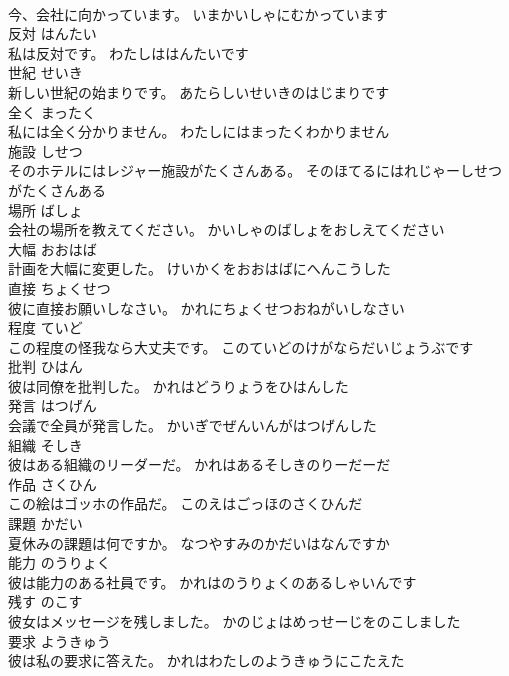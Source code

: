 \documentclass[8pt]{extreport}
\begin{document}
\begin{CJK}{UTF8}{min}
\\	今、会社に向かっています。	いまかいしゃにむかっています	
\\	反対	はんたい	
\\	私は反対です。	わたしははんたいです	
\\	世紀	せいき	
\\	新しい世紀の始まりです。	あたらしいせいきのはじまりです	
\\	全く	まったく	
\\	私には全く分かりません。	わたしにはまったくわかりません	
\\	施設	しせつ	
\\	そのホテルにはレジャー施設がたくさんある。	そのほてるにはれじゃーしせつがたくさんある	
\\	場所	ばしょ	
\\	会社の場所を教えてください。	かいしゃのばしょをおしえてください	
\\	大幅	おおはば	
\\	計画を大幅に変更した。	けいかくをおおはばにへんこうした	
\\	直接	ちょくせつ	
\\	彼に直接お願いしなさい。	かれにちょくせつおねがいしなさい	
\\	程度	ていど	
\\	この程度の怪我なら大丈夫です。	このていどのけがならだいじょうぶです	
\\	批判	ひはん	
\\	彼は同僚を批判した。	かれはどうりょうをひはんした	
\\	発言	はつげん	
\\	会議で全員が発言した。	かいぎでぜんいんがはつげんした	
\\	組織	そしき	
\\	彼はある組織のリーダーだ。	かれはあるそしきのりーだーだ	
\\	作品	さくひん	
\\	この絵はゴッホの作品だ。	このえはごっほのさくひんだ	
\\	課題	かだい	
\\	夏休みの課題は何ですか。	なつやすみのかだいはなんですか	
\\	能力	のうりょく	
\\	彼は能力のある社員です。	かれはのうりょくのあるしゃいんです	
\\	残す	のこす	
\\	彼女はメッセージを残しました。	かのじょはめっせーじをのこしました	
\\	要求	ようきゅう	
\\	彼は私の要求に答えた。	かれはわたしのようきゅうにこたえた	

\end{CJK}
\end{document}
